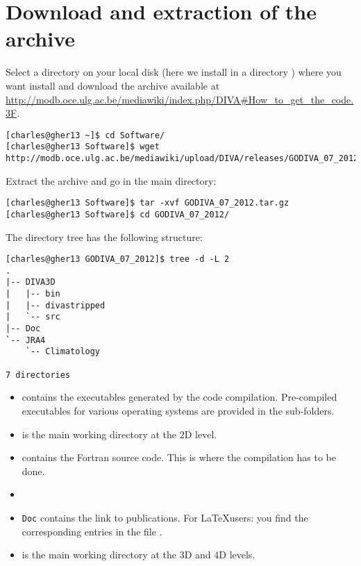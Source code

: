 \section{Download and extraction of the archive}

Select a directory on your local disk (here we install in a directory ) where you want install \diva and download the archive available at \url{http://modb.oce.ulg.ac.be/mediawiki/index.php/DIVA#How_to_get_the_code.3F}.

\begin{lstlisting}[style=Bash]
[charles@gher13 ~]$ cd Software/
[charles@gher13 Software]$ wget http://modb.oce.ulg.ac.be/mediawiki/upload/DIVA/releases/GODIVA_07_2012.tar.gz
\end{lstlisting}

Extract the archive and go in the main directory:
\begin{lstlisting}[style=Bash]
[charles@gher13 Software]$ tar -xvf GODIVA_07_2012.tar.gz
[charles@gher13 Software]$ cd GODIVA_07_2012/
\end{lstlisting}

The directory tree has the following structure: %
\begin{lstlisting}[style=Bash]
[charles@gher13 GODIVA_07_2012]$ tree -d -L 2
.
|-- DIVA3D
|   |-- bin
|   |-- divastripped
|   `-- src
|-- Doc
`-- JRA4
    `-- Climatology

7 directories
\end{lstlisting}


\begin{itemize}
\item {} contains the executables generated by the code compilation. Pre-compiled executables for various operating systems are provided in the sub-folders.
\item {} is the main working directory at the 2D level. 
\item {} contains the Fortran source code. This is where the compilation has to be done.
\item[]
\item \texttt{Doc} contains the link to publications. For \LaTeX users: you find the corresponding \BibTeX  entries in the file .
\item {} is the main working directory at the 3D and 4D levels.
\end{itemize}

